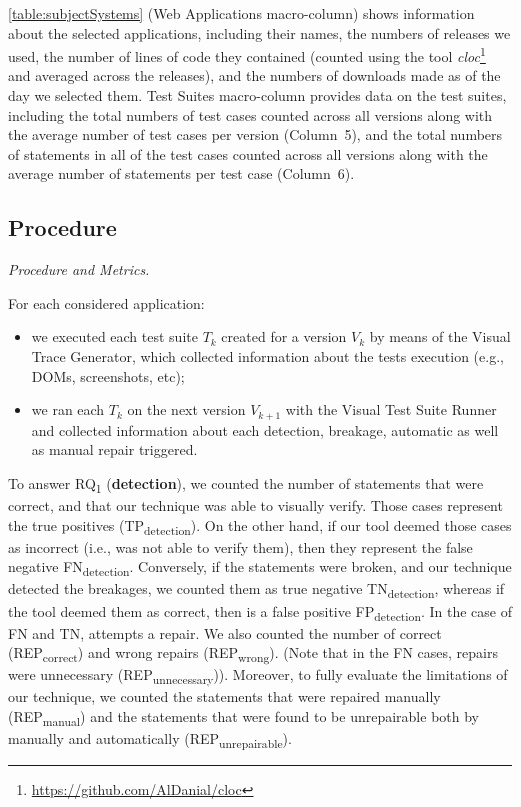 \autoref{table:subjectSystems} (Web Applications macro-column) shows information about the selected applications, including their names, the numbers of releases we used, the number of lines of code they contained (counted using the tool {\it cloc}\footnote{\url{https://github.com/AlDanial/cloc}} and averaged across the releases), and the numbers of downloads made as of the day we selected them.
Test Suites macro-column provides data on the test suites, including the total numbers of test cases counted across all versions along with the average number of test cases per version (Column~5), and the total numbers of statements in all of the test cases counted across all versions along with the average number of statements per test case (Column~6).

\subsection{Procedure}\label{sec:procedure}

\textit{Procedure and Metrics.}

For each considered application: 

\begin{itemize}
\item we executed each test suite $T_k$ created for a version $V_k$ by means of the Visual Trace Generator, which collected information about the tests execution (e.g., DOMs, screenshots, etc);
\item we ran each $T_k$ on the next version $V_{k+1}$ with the Visual Test Suite Runner and collected information about each detection, breakage, automatic as well as manual repair triggered.
\end{itemize}

\noindent
To answer RQ\textsubscript{1} (\textbf{detection}), we counted the number of statements that were correct, and that our technique was able to visually verify. Those cases represent the true positives (TP\textsubscript{detection}). On the other hand, if our tool deemed those cases as incorrect (i.e., was not able to verify them), then they represent the false negative FN\textsubscript{detection}. Conversely, if the statements were broken, and our technique detected the breakages, we counted them as true negative TN\textsubscript{detection}, whereas if the tool deemed them as correct, then is a false positive FP\textsubscript{detection}.
%
In the case of FN and TN, \tool attempts a repair. We also counted the number of correct (REP\textsubscript{correct}) and wrong repairs (REP\textsubscript{wrong}). (Note that in the FN cases, repairs were unnecessary (REP\textsubscript{unnecessary})). Moreover, to fully evaluate the limitations of our technique, we counted the statements that were repaired manually (REP\textsubscript{manual}) and the statements that were found to be unrepairable both by manually and automatically (REP\textsubscript{unrepairable}).

